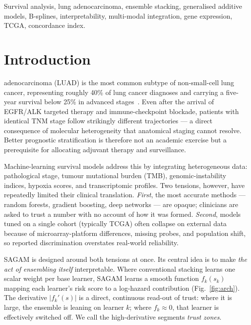 \documentclass[journal]{IEEEtran}
\begin{document}
\begin{IEEEkeywords}
Survival analysis, lung adenocarcinoma, ensemble stacking, generalised
additive models, B-splines, interpretability, multi-modal integration,
gene expression, TCGA, concordance index.
\end{IEEEkeywords}

\section{Introduction}
 adenocarcinoma (LUAD) is the most common subtype of
non-small-cell lung cancer, representing roughly 40\% of lung cancer
diagnoses and carrying a five-year survival below 25\% in advanced
stages~\cite{siegel2024cancer}. Even after the arrival of EGFR/ALK targeted
therapy and immune-checkpoint blockade, patients with identical TNM stage
follow strikingly different trajectories --- a direct consequence of molecular
heterogeneity that anatomical staging cannot resolve. Better prognostic
stratification is therefore not an academic exercise but a prerequisite for
allocating adjuvant therapy and surveillance.

Machine-learning survival models address this by integrating heterogeneous
data: pathological stage, tumour mutational burden (TMB), genomic-instability
indices, hypoxia scores, and transcriptomic profiles. Two tensions, however,
have repeatedly limited their clinical translation. \emph{First}, the most
accurate methods --- random forests, gradient boosting, deep networks ---
are opaque; clinicians are asked to trust a number with no account of how it
was formed. \emph{Second}, models tuned on a single cohort (typically TCGA)
often collapse on external data because of microarray-platform differences,
missing probes, and population shift, so reported discrimination overstates
real-world reliability.

SAGAM is designed around both tensions at once. Its central idea is to make
\emph{the act of ensembling itself} interpretable. Where conventional stacking
learns one scalar weight per base learner, SAGAM learns a smooth function
$f_k(s_k)$ mapping each learner's risk score to a log-hazard contribution
(Fig.~\ref{fig:arch}). The derivative $|f_k'(s)|$ is a direct, continuous
read-out of trust: where it is large, the ensemble is leaning on learner $k$;
where $f_k\!\approx\!0$, that learner is effectively switched off. We call the
high-derivative segments \emph{trust zones}.
\end{document}
